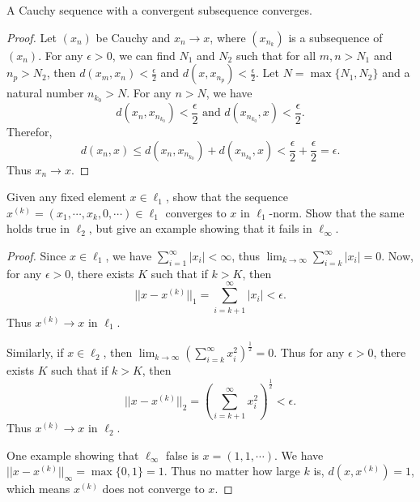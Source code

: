 \documentclass[12pt, a4paper]{article}
\theoremstyle{plain}
\begin{document}
\begin{exercise}{37}
A Cauchy sequence with a convergent subsequence converges.
\end{exercise}
	\begin{proof}
	Let $(x_n)$ be Cauchy and $x_n\rightarrow x$, where $(x_{n_k})$ is a subsequence of $(x_n)$. For any $\epsilon >0$, we can find $N_1$ and $N_2$ such that for all $m,n>N_1$ and $n_p>N_2$, then $d(x_m,x_n)<\frac{\epsilon}{2}$ and $d(x,x_{n_p})<\frac{\epsilon}{2}$. Let $N=\max\{N_1,N_2\}$ and a natural number $n_{k_0}>N$. For any $n>N$, we have
	\[
	d(x_n,x_{n_{k_0}})<\frac{\epsilon}{2} \text{ and } d(x_{n_{k_0}},x)<\frac{\epsilon}{2}.
	\]
	Therefor,
	\[
	d(x_n,x)\leq d(x_n,x_{n_{k_0}})+d(x_{n_{k_0}},x)<\frac{\epsilon}{2}+\frac{\epsilon}{2}=\epsilon.
	\]
	Thus $x_n\rightarrow x$.
	\end{proof}
	
\begin{exercise}{40}
Given any fixed element $x\in\ell_1$, show that the sequence $x^{(k)}=(x_1,\cdots,x_k,0,\cdots)\in\ell_1$ converges to $x$ in $\ell_1$-norm. Show that the same holds true in $\ell_2$, but give an example showing that it fails in $\ell_\infty$.
\end{exercise}
	\begin{proof}
	Since $x\in\ell_1$, we have $\sum_{i=1}^{\infty}{|x_i|}<\infty$, thus $\lim_{k\rightarrow\infty}\sum_{i=k}^{\infty}{|x_i|}=0$. Now, for any $\epsilon >0$, there exists $K$ such that if $k>K$, then
	\[
	||x-x^{(k)}||_1=\sum_{i=k+1}^{\infty}{|x_i|}<\epsilon.
	\]
	Thus $x^{(k)}\rightarrow x$ in $\ell_1$.
	
	Similarly, if $x\in\ell_2$, then $\lim_{k\rightarrow\infty}(\sum_{i=k}^{\infty}{x_i^2})^\frac{1}{2}=0$. Thus for any $\epsilon>0$, there exists $K$ such that if $k>K$, then 
	\[
	||x-x^{(k)}||_2=\left(\sum_{i=k+1}^{\infty}{x_i^2}\right)^\frac{1}{2}<\epsilon.
	\]
	Thus $x^{(k)}\rightarrow x$ in $\ell_2$.
	
	One example showing that $\ell_\infty$ false is $x=(1,1,\cdots)$. We have $||x-x^{(k)}||_\infty=\max\{0,1\}=1$. Thus no matter how large $k$ is, $d(x,x^{(k)})=1$, which means $x^{(k)}$ does not converge to $x$.
	\end{proof}
\end{document}
